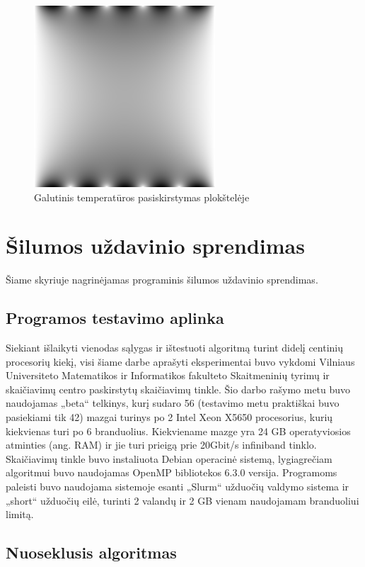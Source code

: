 \documentclass{VUMIFPSbakalaurinis}
\begin{document}
\begin{figure}[H]
    \centering
    \includegraphics[scale=0.7]{img/image_1000000.png}
    \caption{Galutinis temperatūros pasiskirstymas plokštelėje}
    \label{img:end}
\end{figure}

\section{Šilumos uždavinio sprendimas}

Šiame skyriuje nagrinėjamas programinis šilumos uždavinio sprendimas.


\subsection{Programos testavimo aplinka}

Siekiant išlaikyti vienodas sąlygas ir ištestuoti algoritmą turint didelį centinių procesorių kiekį, visi šiame darbe aprašyti eksperimentai buvo vykdomi Vilniaus Universiteto Matematikos ir Informatikos fakulteto Skaitmeninių tyrimų ir skaičiavimų centro paskirstytų skaičiavimų tinkle.
Šio darbo rašymo metu buvo naudojamas „beta“ telkinys, kurį sudaro 56 (testavimo metu praktiškai buvo pasiekiami tik 42) mazgai turinys po 2 Intel Xeon X5650 procesorius, kurių kiekvienas turi po 6 branduolius. 
Kiekviename mazge yra 24 GB operatyviosios atminties (ang. RAM) ir jie turi prieigą prie 20Gbit/s infiniband tinklo.
Skaičiavimų tinkle buvo instaliuota Debian operacinė sistemą, lygiagrečiam algoritmui buvo naudojamas OpenMP bibliotekos 6.3.0 versija.
Programoms paleisti buvo naudojama sistemoje esanti „Slurm“ užduočių valdymo sistema ir „short“ užduočių eilė, turinti 2 valandų ir 2 GB vienam naudojamam branduoliui limitą.

\subsection{Nuoseklusis algoritmas}
\end{document}

